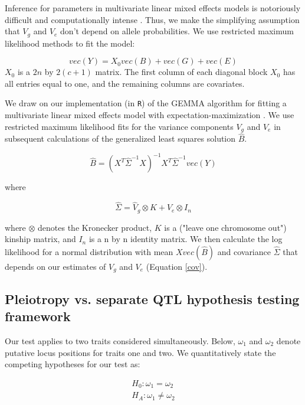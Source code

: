\documentclass[12pt,twoside, lineno]{gsajnl}
\begin{document}
Inference for parameters in multivariate linear mixed effects models is notoriously difficult and computationally intense \citep{meyer1989restricted,meyer1991estimating}. Thus, we make the simplifying assumption that $V_g$ and $V_e$ don't depend on allele probabilities. We use restricted maximum likelihood methods to fit the model:

\begin{equation}
vec(Y) = X_0vec(B) + vec(G) + vec(E)
\label{model}
\end{equation}
$X_0$ is a $2n$ by $2(c + 1)$ matrix. The first column of each diagonal block $X_0$ has all entries equal to one, and the remaining columns are covariates. 

We draw on our implementation \citep{gemma2} (in \texttt{R}) of the GEMMA algorithm for fitting a multivariate linear mixed effects model with expectation-maximization \citep{zhou2014efficient}. We use restricted maximum likelihood fits for the variance components $V_g$ and $V_e$ in subsequent calculations of the generalized least squares solution $\hat B$. 

\begin{equation}
    \hat B = (X^T\hat\Sigma^{-1}X)^{-1}X^T\hat\Sigma^{-1}vec(Y)
\end{equation}

\noindent where 

\begin{equation}
    \hat\Sigma = \hat V_g \otimes K + \hat V_e \otimes I_n
    \label{cov}
\end{equation}

\noindent where $\otimes$ denotes the Kronecker product, $K$ is a ("leave one chromosome out") kinship matrix, and $I_n$ is a n by n identity matrix. We then calculate the log likelihood for a normal distribution with mean $X vec(\hat B)$ and covariance $\hat \Sigma$ that depends on our estimates of $V_g$ and $V_e$ (Equation \ref{cov}). 

\subsection{Pleiotropy vs. separate QTL hypothesis testing framework}

Our test applies to two traits considered simultaneously. Below, $\omega_1$ and $\omega_2$ denote putative locus positions for traits one and two. We quantitatively state the competing hypotheses for our test as:

\begin{eqnarray}
H_0: \omega_1 = \omega_2 \nonumber\\
H_A: \omega_1 \neq \omega_2
\label{eqn:hypotheses}
\end{eqnarray}
\end{document}
